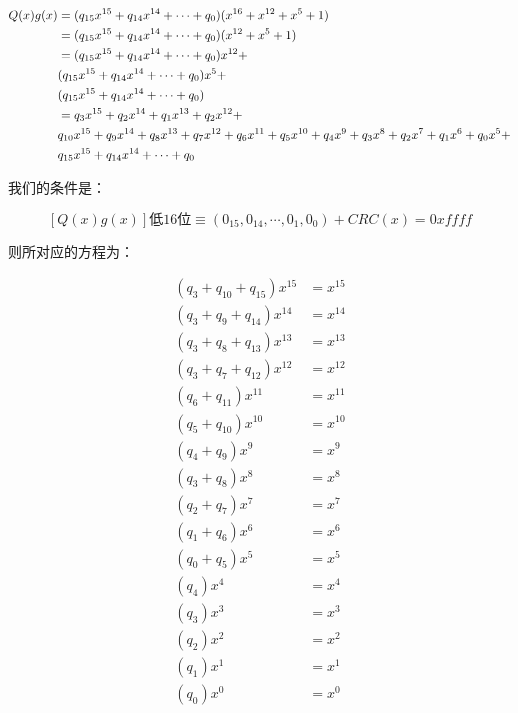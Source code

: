 \documentclass[
]{article}
\begin{document}
\begin{align}
Q(x)g(x)&=(q_{15}x^{15}+q_{14}x^{14}+\cdots+q_0)(x^{16}+x^{12}+x^5+1)\\
&=(q_{15}x^{15}+q_{14}x^{14}+\cdots+q_0)(x^{12}+x^5+1)\\
&=(q_{15}x^{15}+q_{14}x^{14}+\cdots+q_0)x^{12} +\\
& \space \space \space \space \space \space(q_{15}x^{15}+q_{14}x^{14}+\cdots+q_0)x^5 +\\
& \space \space \space \space \space \space(q_{15}x^{15}+q_{14}x^{14}+\cdots+q_0)\\
&=q_3x^{15}+q_2x^{14}+q_1x^{13}+q_2x^{12}+\\
& \space \space \space \space \space \space q_{10}x^{15}+q_9x^{14}+q_8x^{13}+q_7x^{12}+q_6x^{11}+q_5x^{10}+q_4x^{9}+q_3x^{8}+q_2x^{7}+q_1x^{6}+q_0x^{5}+\\
& \space \space \space \space \space \space q_{15}x^{15}+q_{14}x^{14}+\cdots+q_0
\end{align}

我们的条件是：

$$
[Q(x)g(x)]低16位 \equiv (0_{15},0_{14},\cdots,0_1,0_0)+CRC(x)=0xffff
$$

则所对应的方程为：

\begin{align}
(q_{3}+q_{10}+q_{15})x^{15}&=x^{15}\\
(q_{3}+q_{ 9}+q_{14})x^{14}&=x^{14}\\
(q_{3}+q_{ 8}+q_{13})x^{13}&=x^{13}\\
(q_{3}+q_{ 7}+q_{12})x^{12}&=x^{12}\\
(      q_{ 6}+q_{11})x^{11}&=x^{11}\\
(      q_{ 5}+q_{10})x^{10}&=x^{10}\\
(      q_{ 4}+q_{ 9})x^{ 9}&=x^{ 9}\\
(      q_{ 3}+q_{ 8})x^{ 8}&=x^{ 8}\\
(      q_{ 2}+q_{ 7})x^{ 7}&=x^{ 7}\\
(      q_{ 1}+q_{ 6})x^{ 6}&=x^{ 6}\\
(      q_{ 0}+q_{ 5})x^{ 5}&=x^{ 5}\\
(             q_{ 4})x^{ 4}&=x^{ 4}\\
(             q_{ 3})x^{ 3}&=x^{ 3}\\
(             q_{ 2})x^{ 2}&=x^{ 2}\\
(             q_{ 1})x^{ 1}&=x^{ 1}\\
(             q_{ 0})x^{ 0}&=x^{ 0}\\
\end{align}
\end{document}
